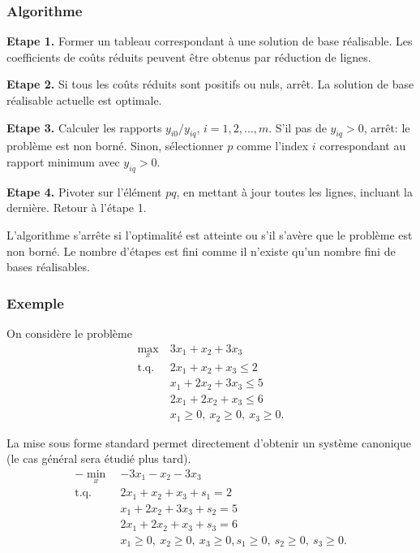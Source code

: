 \documentclass[t,usepdftitle=false]{beamer}
\begin{document}
\begin{frame}
\frametitle{Algorithme}

\textbf{Etape 1.}
Former un tableau correspondant à une solution de base réalisable. Les coefficients de coûts réduits peuvent être obtenus par réduction de lignes.

\mbox{}

\textbf{Etape 2.}
Si tous les coûts réduits sont positifs ou nuls, arrêt. La solution de base réalisable actuelle est optimale.

\mbox{}

\textbf{Etape 3.}
Calculer les rapports $y_{i0}/y_{iq}$, $i = 1, 2, \ldots, m$. S'il pas de $y_{iq} > 0$, arrêt: le problème est non borné. Sinon, sélectionner $p$ comme l'index $i$ correspondant au rapport minimum avec $y_{iq} > 0$.

\mbox{}

\textbf{Etape 4.} Pivoter sur l'élément $pq$, en mettant à jour toutes les lignes, incluant la dernière. Retour à l'étape 1.

\mbox{}

L'algorithme s'arrête si l'optimalité est atteinte ou s'il s'avère que le problème est non borné. Le nombre d'étapes est fini comme il n'existe qu'un nombre fini de bases réalisables.

\end{frame}

\begin{frame}
\frametitle{Exemple}

On considère le problème
\begin{align*}
\max_x\ & 3x_1 + x_2 +3x_3 \\
\mbox{t.q. } & 2x_1 + x_2 + x_3 \leq 2 \\
& x_1 + 2x_2 + 3x_3 \leq 5 \\
& 2x_1 + 2x_2 + x_3 \leq 6 \\
& x_1 \geq 0,\ x_2 \geq 0,\ x_3 \geq 0.
\end{align*}

La mise sous forme standard permet directement d'obtenir un système canonique (le cas général sera étudié plus tard).
\begin{align*}
- \min_x\ & -3x_1 - x_2 - 3x_3 \\
\mbox{t.q. } & 2x_1 + x_2 + x_3 + s_1 = 2 \\
& x_1 + 2x_2 + 3x_3 + s_2 = 5 \\
& 2x_1 + 2x_2 + x_3 + s_3 = 6 \\
& x_1 \geq 0,\ x_2 \geq 0,\ x_3 \geq 0, s_1 \geq 0,\ s_2 \geq 0,\ s_3 \geq 0.
\end{align*}

\end{frame}
\end{document}

